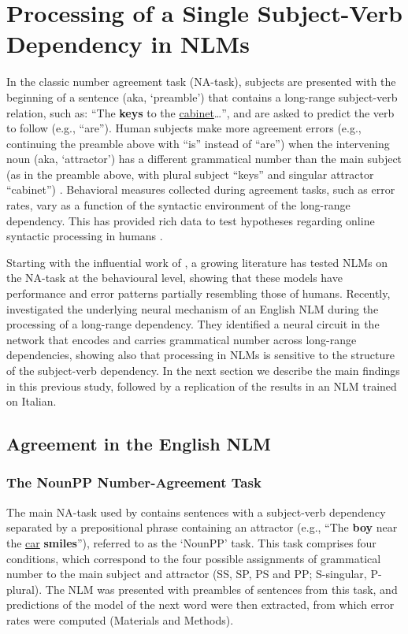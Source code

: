 \section{Processing of a Single Subject-Verb Dependency in NLMs}
In the classic number agreement task (NA-task), subjects are presented with the beginning of a sentence (aka, `preamble') that contains a long-range subject-verb relation, such as: ``The \textbf{keys} to the \underline{cabinet}\ldots'', and are asked to predict the verb to follow (e.g., ``are''). 
Human subjects make more agreement errors (e.g., continuing the preamble  above with ``is'' instead of ``are'') when the intervening noun (aka, `attractor') has a different grammatical number than the main subject (as in the preamble above, with plural subject ``keys'' and singular attractor ``cabinet'') \citep{Bock:Miller:1991}.
Behavioral measures collected during agreement tasks, such as error rates, vary as a function of the syntactic environment of the long-range dependency. This has provided rich data to test hypotheses regarding online syntactic processing in humans \citep[e.g., ][]{franck2002subject, franck2006agreement, franck2007syntactic}.

Starting with the influential work of \citet{Linzen:etal:2016}, a growing
literature \citep[e.g.,][]{Gulordava:etal:2018, Bernardy:Lappin:2017,
  Giulianelli:etal:2018, Kuncoro:etal:2018a,Linzen:Leonard:2018,jumelet2019analysing} has
tested NLMs on the NA-task at the behavioural level, showing that these models have performance and error patterns partially resembling those of humans.
Recently, \citet{lakretz2019emergence} investigated the underlying neural mechanism of an English NLM during the processing of a long-range dependency. They identified a neural circuit in the network that encodes and carries grammatical number across long-range dependencies, showing also that processing in NLMs is sensitive to the structure of the subject-verb dependency. 
In the next section we describe the main findings in this previous study, followed by a replication of the results in an NLM trained on Italian. 

\subsection{Agreement in the English NLM}

\subsubsection{The NounPP Number-Agreement Task}
The main NA-task used by \citet{lakretz2019emergence} contains sentences with a subject-verb dependency separated by a prepositional phrase containing an attractor (e.g., ``The \textbf{boy} near the \underline{car} \textbf{smiles}''), referred to as the `NounPP' task. This task comprises four conditions, which correspond to the four possible assignments of grammatical number to the main subject and attractor (SS, SP, PS and PP; S-singular, P-plural). The NLM was presented with preambles of sentences from this task, and predictions of the model of the next word were then extracted, from which error rates were computed (Materials and Methods). 

